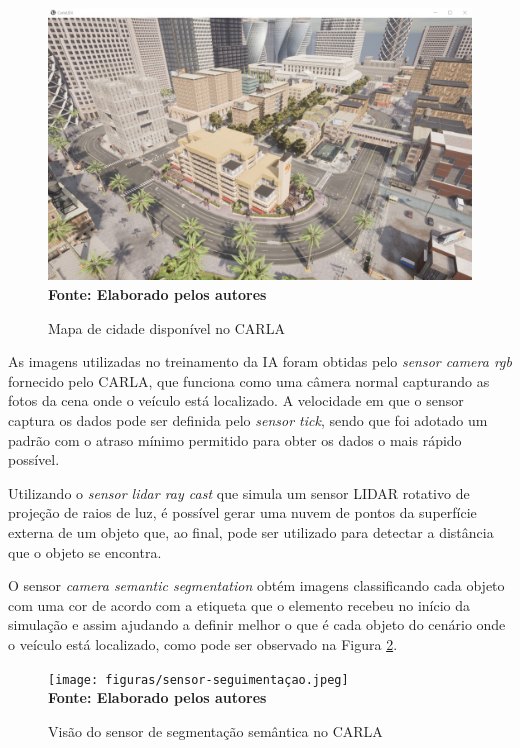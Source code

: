 \documentclass[a4paper,12pt,Times]{article}
\begin{document}
\begin{figure}[!htb]

  \centering
    \caption{Mapa de cidade disponível no CARLA}
    \includegraphics[scale=0.25]{figuras/mapa1-carla.jpeg}
    \captionsetup{justification=centering}
  \vspace{-0.2cm}
     \\\textbf{\footnotesize Fonte: Elaborado pelos autores}
    \label{fig:cidade_carla_simulator_primeira_pessoa}

\end{figure}


As imagens utilizadas no treinamento da IA foram obtidas pelo \textit{sensor camera rgb} fornecido pelo CARLA, que funciona como uma câmera normal capturando as fotos da cena onde o veículo está localizado. A velocidade em que o sensor captura os dados pode ser definida pelo \textit{sensor tick}, sendo que foi adotado um padrão com o atraso mínimo permitido para obter os dados o mais rápido possível.

Utilizando o \textit{sensor lidar ray cast} que simula um sensor LIDAR rotativo de projeção de raios de luz, é possível gerar uma nuvem de pontos da superfície externa de um objeto que, ao final, pode ser utilizado para detectar a distância que o objeto se encontra.

O sensor \textit{camera semantic segmentation} obtém imagens classificando cada objeto com uma cor de acordo com a etiqueta que o elemento recebeu no início da simulação e assim ajudando a definir melhor o que é cada objeto do cenário onde o veículo está localizado, como pode ser observado na Figura \ref{fig:carla_simulator_sensor_segmentacao}.

\begin{figure}[h]
    \centering
    \caption{Visão do sensor de segmentação semântica no CARLA}
    \texttt{[image: figuras/sensor-seguimentaçao.jpeg]}\captionsetup{justification=centering}
  \vspace{-0.2cm}
     \\\textbf{\footnotesize Fonte: Elaborado pelos autores}
    \label{fig:carla_simulator_sensor_segmentacao}
\end{figure}
\end{document}
